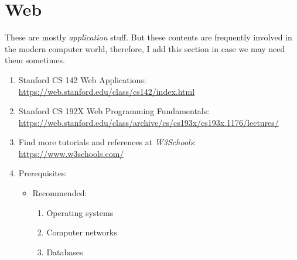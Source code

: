 \documentclass{article}
\begin{document}
\section{Web}
These are mostly \emph{application} stuff.
But these contents are frequently involved in the modern computer world, therefore, I add this section in case we may need them sometimes.
\begin{enumerate}
    \item Stanford CS 142 Web Applications:\\
    \href{https://web.stanford.edu/class/cs142/index.html}{https://web.stanford.edu/class/cs142/index.html}
    \item Stanford CS 192X Web Programming Fundamentals:\\
    \href{https://web.stanford.edu/class/archive/cs/cs193x/cs193x.1176/lectures/}{https://web.stanford.edu/class/archive/cs/cs193x/cs193x.1176/lectures/}
    \item Find more tutorials and references at \emph{W3Schools}:
    \href{https://www.w3schools.com/}{https://www.w3schools.com/}
    \item Prerequisites:
    \begin{itemize}
        \item Recommended:
        \begin{enumerate}
            \item Operating systems
            \item Computer networks
            \item Databases
        \end{enumerate}
    \end{itemize}
\end{enumerate}
\end{document}
